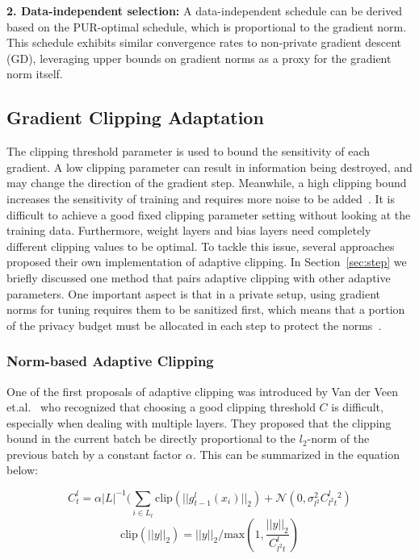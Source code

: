\textbf{2. Data-independent selection:}  
   A data-independent schedule can be derived based on the PUR-optimal schedule, which is proportional to the gradient norm. This schedule exhibits similar convergence rates to non-private gradient descent (GD), leveraging upper bounds on gradient norms as a proxy for the gradient norm itself.
   
\subsection{Gradient Clipping Adaptation}
\label{sec:adaclip}

The clipping threshold parameter is used to bound the sensitivity of each gradient. A low clipping parameter can result in information being destroyed, and may change the direction of the gradient step. Meanwhile, a high clipping bound increases the sensitivity of training and requires more noise to be added~\cite{RefWorks:RefID:40-abadi2016deep}. It is difficult to achieve a good fixed clipping parameter setting without looking at the training data. Furthermore, weight layers and bias layers need completely different clipping values to be optimal. To tackle this issue, several approaches proposed their own implementation of adaptive clipping. 
In Section~\ref{sec:step} we briefly discussed one method that pairs adaptive clipping with other adaptive parameters. One important aspect is that in a private setup, using gradient norms for tuning requires them to be sanitized first, which means that a portion of the privacy budget must be allocated in each step to protect the norms~\cite{RefWorks:RefID:39-he2022exploring}.

\subsubsection{Norm-based Adaptive Clipping}
\label{sec:normclip}
One of the first proposals of adaptive clipping was introduced by Van der Veen et.al.~\cite{RefWorks:RefID:36-lennarttools} who recognized that choosing a good clipping threshold $C$ is difficult, especially when dealing with multiple layers. They proposed that the clipping bound in the current batch be directly proportional to the $l_2$-norm of the previous batch by a constant factor $\alpha$. This can be summarized in the equation below: 

\[ C_t^l = \alpha|L|^{-1}(\sum_{i\in L_t}\text{clip}(||g_{t-1}^l(x_i)||_2)+\mathcal{N}(0,\sigma_{l^2}^2 C_{l^2t}^l ^2)\]
\[ \text{clip}(||y||_2)=||y||_2/\text{max}(1,\frac{||y||_2}{C_{l^2t}^l})\]

